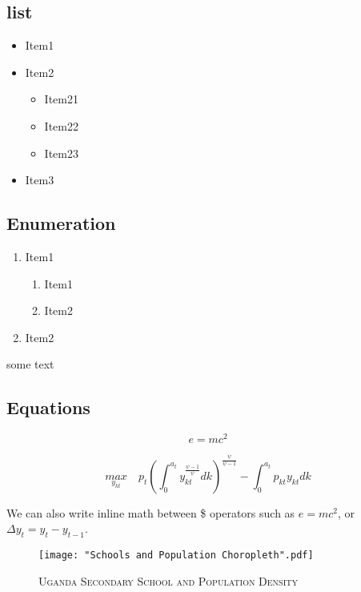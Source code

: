 \documentclass[a4paper]{article}
\begin{document}
\subsection{list}
\begin{itemize}%
\item Item1
\item Item2
\begin{itemize}%
\item Item21
\item Item22
\item Item23
\end{itemize}
\item Item3
\end{itemize}

\subsection*{Enumeration} %

\begin{enumerate}%
\item Item1
\begin{enumerate}
\item Item1
\item Item2
\end{enumerate}
\item Item2
\end{enumerate}

some text

\subsection*{Equations} %

\begin{equation} 
e = mc^2
\end{equation}

\begin{equation}
\underset{y_{kt}}{max}\quad p_t\left(\int_0^{a_t}y_{kt}^{\frac{\psi-1}{\psi}}dk\right)^{\frac{\psi}{\psi-1}}-\int_0^{a_t}p_{kt}y_{kt}dk
\end{equation}


We can also write inline math between \$ operators such as $e=mc^2$, or $\Delta y_t = y_t - y_{t-1}$.



\begin{figure}[H]
\centering
\caption{\textsc{Uganda Secondary School and Population Density}}
\label{fig:pl1}
\texttt{[image: "Schools and Population Choropleth".pdf]} %
\end{figure}
\end{document}
